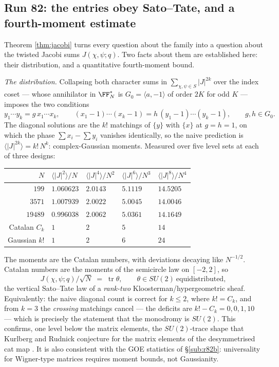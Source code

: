 \subsection{Run 82: the entries obey Sato--Tate, and a fourth-moment
estimate}\label{sub:r82c}

Theorem \ref{thm:jacobi} turns every question about the family into a question
about the twisted Jacobi sums $J(\chi,\psi;q)$.  Two facts about them are
established here: their distribution, and a quantitative fourth-moment bound.

\emph{The distribution.}  Collapsing both character sums in
$\sum_{\chi,\psi\in S}|J|^{2k}$ over the index coset --- whose annihilator in
$\FF_N^*$ is $G_0=\langle a,-1\rangle$ of order $2K$ for odd $K$ --- imposes the
two conditions
\[
  y_1\cdots y_k=g\,x_1\cdots x_k,\qquad
  (x_1-1)\cdots(x_k-1)=h\,(y_1-1)\cdots(y_k-1),
  \qquad g,h\in G_0 .
\]
The diagonal solutions are the $k!$ matchings of $\{y\}$ with $\{x\}$ at
$g=h=1$, on which the phase $\sum x_i-\sum y_i$ vanishes identically, so the
naive prediction is $\langle|J|^{2k}\rangle=k!\,N^k$: complex-Gaussian moments.
Measured over five level sets at each of three designs:
\begin{center}\small
\begin{tabular}{rllll}
\toprule
$N$ & $\langle|J|^2\rangle/N$ & $\langle|J|^4\rangle/N^2$ & $\langle|J|^6\rangle/N^3$ & $\langle|J|^8\rangle/N^4$\\
\midrule
$199$ & $1.060623$ & $2.0143$ & $5.1119$ & $14.5205$\\
$3571$ & $1.007939$ & $2.0022$ & $5.0045$ & $14.0046$\\
$19489$ & $0.996038$ & $2.0062$ & $5.0361$ & $14.1649$\\
\midrule
Catalan $C_k$ & $1$ & $2$ & $5$ & $14$\\
Gaussian $k!$ & $1$ & $2$ & $6$ & $24$\\
\bottomrule
\end{tabular}
\end{center}
The moments are the Catalan numbers, with deviations decaying like $N^{-1/2}$.
Catalan numbers are the moments of the semicircle law on $[-2,2]$, so
\[
  J(\chi,\psi;q)/\sqrt N \;=\; \operatorname{tr}\theta,
  \qquad \theta\in SU(2)\ \text{equidistributed},
\]
the vertical Sato--Tate law of a \emph{rank-two} Kloosterman/hypergeometric
sheaf.  Equivalently: the naive diagonal count is correct for $k\le2$, where
$k!=C_k$, and from $k=3$ the \emph{crossing} matchings cancel --- the deficits
are $k!-C_k=0,0,1,10$ --- which is precisely the statement that the monodromy is
$SU(2)$.  This confirms, one level below the matrix elements, the
$SU(2)$-trace shape that Kurlberg and Rudnick conjecture for the matrix elements
of the desymmetrised cat map \cite{KR2003}.  It is also consistent with the GOE
statistics of \S\ref{sub:r82b}: universality for Wigner-type matrices requires
moment bounds, not Gaussianity.

